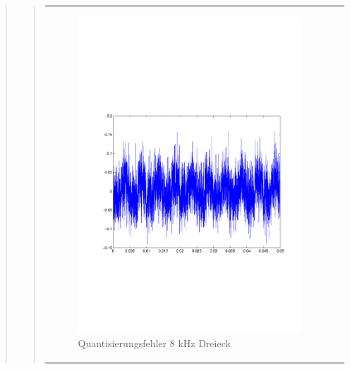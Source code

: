 \begin{quote}
\begin{quote}
\begin{center}
\begin{tabular}{ll}
                \begin{minipage}{0.6\textwidth}
                    \begin{figure}[H]
                        \includegraphics[scale=0.55, trim = 16mm 70mm 16mm 85mm,
                        clip]{Bilder/100kHz_dreieck_Quantisierungsfehler}
                       \caption{Quantisierungsfehler 8 kHz Dreieck}
		              \label{fig:QuantErr 8 kHz Dreieck}
                    \end{figure}
                \end{minipage}
            
            \end{tabular}
            \end{center}
            
            \vspace{2em}
	   	

\end{quote}
\end{quote}
